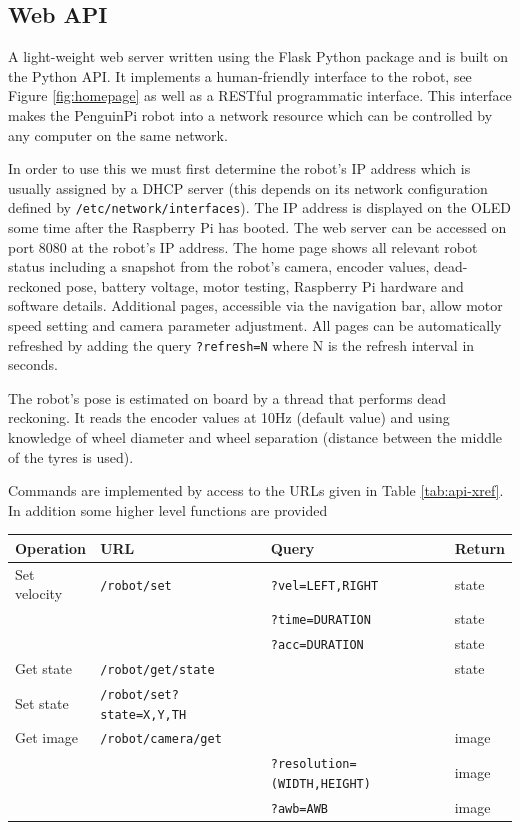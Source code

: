 \documentclass[11pt,fleqn]{article}
\begin{document}
\subsection{Web API}
A light-weight web server written using the Flask Python package and is built on the Python API.
It implements  a human-friendly interface to the robot, see Figure \ref{fig:homepage}  as well as a
 RESTful programmatic interface. 
This interface  makes the PenguinPi robot into a network resource which can be controlled
 by any computer on the same network.
 
 In order to use this we must first determine the robot's IP address which is usually assigned by a DHCP server (this depends on its network configuration defined by \texttt{/etc/network/interfaces}).  
 The IP address is displayed on the OLED some time after the Raspberry Pi
has booted.
The web server can be accessed on port 8080 at the robot's IP address.  The home page shows all relevant robot status including 
a snapshot from the robot's camera, encoder values, dead-reckoned pose, battery voltage, motor testing, Raspberry Pi hardware and software details. 
Additional pages, accessible via the navigation bar, allow motor speed setting and camera parameter adjustment.
All pages can be automatically refreshed by adding the query \texttt{?refresh=N} where N is the refresh interval in seconds.

The robot's pose is estimated on board by a thread that performs dead reckoning.  It reads the encoder values at 10\unit{Hz} (default value) and using knowledge of wheel
diameter and wheel separation (distance between the middle of the tyres is used).


Commands are implemented by access to the URLs given in Table \ref{tab:api-xref}.  In addition some higher level functions are provided

\begin{tabular}{|l|l|l|l|} \hline
Operation & URL & Query & Return \\\hline\hline
Set velocity & \texttt{/robot/set} & \texttt{?vel=LEFT,RIGHT} & state \\
 &                      & \texttt{?time=DURATION}  & state\\
 &                      & \texttt{?acc=DURATION} & state \\
Get state & \texttt{/robot/get/state} & & state \\
Set state & \texttt{/robot/set?state=X,Y,TH} && \\ \hline
Get image & \texttt{/robot/camera/get} & & image \\
 & &                  \texttt{?resolution=(WIDTH,HEIGHT)} & image \\
 &  &                 \texttt{?awb=AWB} & image\\\hline
\end{tabular}
\end{document}
